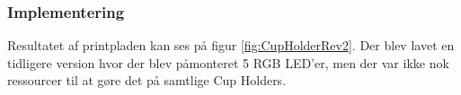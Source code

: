 \documentclass[Rapport/Rapport_main.tex]{subfiles}
\begin{document}
\subsubsection{Implementering}
Resultatet af printpladen kan ses på figur \ref{fig:CupHolderRev2}. Der blev lavet en tidligere version hvor der blev påmonteret 5 RGB LED'er, men der var ikke nok ressourcer til at gøre det på samtlige Cup Holders.
\begin{figure}[H]
\centering
{}
\end{figure}
\end{document}
